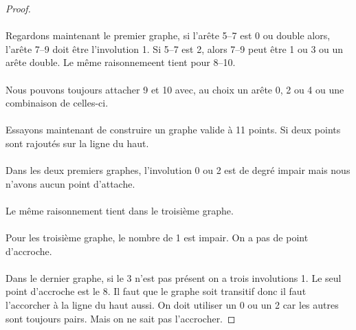 \documentclass[a4paper]{article}
\theoremstyle{mytheorem}
\begin{document}
\begin{proof}
\begin{center}
  \end{center}

  \paragraph{}
  Regardons maintenant le premier graphe, si l'arête 5--7 est 0 ou double alors, l'arête 7--9 doit être l'involution 1. Si 5--7 est 2, alors 7--9 peut être 1 ou 3 ou un arête double. Le même raisonnemeent tient pour 8--10.

  \paragraph{}
  Nous pouvons toujours attacher 9 et 10 avec, au choix un arête 0, 2 ou 4 ou une combinaison de celles-ci.


  \paragraph{}
  Essayons maintenant de construire un graphe valide à 11 points. Si deux points sont rajoutés sur la ligne du haut.

  \paragraph{}
  Dans les deux premiers graphes, l'involution 0 ou 2 est de degré impair mais nous n'avons aucun point d'attache.

  \paragraph{}
  Le même raisonnement tient dans le troisième graphe.

  \paragraph{}
  Pour les troisième graphe, le nombre de 1 est impair. On a pas de point d'accroche.

  \paragraph{}
  Dans le dernier graphe, si le 3 n'est pas présent on a trois involutions 1. Le seul point d'accroche est le 8. Il faut que le graphe soit transitif donc il faut l'accorcher à la ligne du haut aussi. On doit utiliser un 0 ou un 2 car les autres sont toujours pairs. Mais on ne sait pas l'accrocher.


\end{proof}
\end{document}
